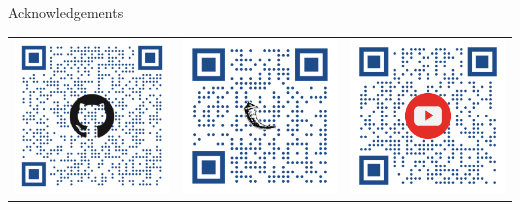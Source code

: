 \documentclass[final]{beamer}
\newlength{\onecolwid}
\begin{document}
\begin{frame}[t]
\begin{columns}[t]
\begin{column}{\onecolwid}
\begin{block}{Acknowledgements}
\small{}

\begin{center}
\begin{tabular}{ccc}
\includegraphics[width=0.3\linewidth]{figure/qr_github} &  \includegraphics[width=0.3\linewidth]{figure/qr_website} & 
\includegraphics[width=0.3\linewidth]{figure/qr_youtube}
\end{tabular}
\end{center}

\end{block}





\end{column} %

\end{columns} %

\end{frame} %
\end{document}
